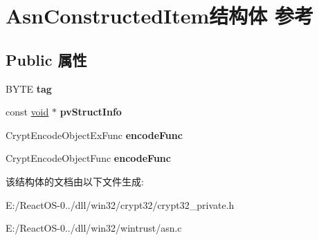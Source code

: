 \hypertarget{struct_asn_constructed_item}{}\section{Asn\+Constructed\+Item结构体 参考}
\label{struct_asn_constructed_item}
\subsection*{Public 属性}
\begin{DoxyCompactItemize}
\item 
\mbox{\label{struct_asn_constructed_item_aeff344386bbec934eba7f62691a85b83}} 
B\+Y\+TE {\bfseries tag}
\item 
\mbox{\label{struct_asn_constructed_item_a1c3612ef7e6dfd20fb972f20691b9a4f}} 
const \hyperlink{interfacevoid}{void} $\ast$ {\bfseries pv\+Struct\+Info}
\item 
\mbox{\label{struct_asn_constructed_item_afc84f7414c718bd3252c871b5749e60e}} 
Crypt\+Encode\+Object\+Ex\+Func {\bfseries encode\+Func}
\item 
\mbox{\label{struct_asn_constructed_item_a69aa3af63c97d09f261cca9b6e4bf319}} 
Crypt\+Encode\+Object\+Func {\bfseries encode\+Func}
\end{DoxyCompactItemize}


该结构体的文档由以下文件生成\+:\begin{DoxyCompactItemize}
\item 
E\+:/\+React\+O\+S-\/0../dll/win32/crypt32/crypt32\+\_\+private.\+h\item 
E\+:/\+React\+O\+S-\/0../dll/win32/wintrust/asn.\+c\end{DoxyCompactItemize}
